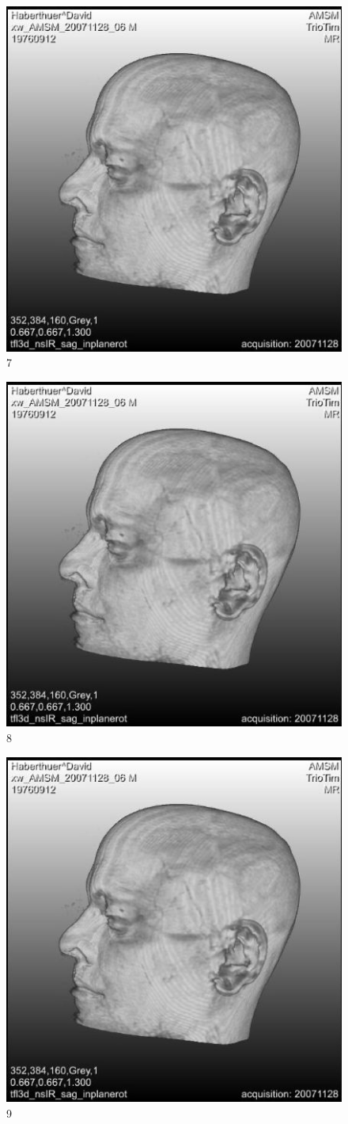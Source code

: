 \documentclass{article}
\begin{document}
\begin{figure}
	\centering
	\includegraphics[width=0.618\linewidth]{scalebarimage}
	\caption{7}
\end{figure}
\clearpage

\begin{figure}
	\centering
	\includegraphics[width=0.618\linewidth]{scalebarimage}
	\caption{8}
\end{figure}
\clearpage

\begin{figure}
	\centering
	\includegraphics[width=0.618\linewidth]{scalebarimage}
	\caption{9}
\end{figure}
\clearpage
\end{document}
